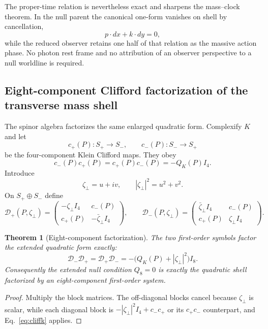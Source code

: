 \documentclass[11pt]{article}
\newtheorem{theorem}{Theorem}[section]
\theoremstyle{definition}\newtheorem{definition}[theorem]{Definition}
\theoremstyle{remark}\newtheorem{remark}[theorem]{Remark}\newtheorem{conjecture}[theorem]{Conjecture}
\begin{document}
The proper-time relation is nevertheless exact and sharpens the mass--clock theorem. In the null parent the canonical one-form vanishes on shell by cancellation,
\begin{equation}
 p\cdot dx+k\cdot dy=0,
\end{equation}
while the reduced observer retains one half of that relation as the massive action phase. No photon rest frame and no attribution of an observer perspective to a null worldline is required.

\subsection{Eight-component Clifford factorization of the transverse mass shell}

The spinor algebra factorizes the same enlarged quadratic form. Complexify $K$ and let
\begin{equation}
 c_+(P):S_+\to S_-,
 \qquad
 c_-(P):S_-\to S_+
\end{equation}
be the four-component Klein Clifford maps. They obey
\begin{equation}\label{eq:cliffk}
 c_-(P)c_+(P)=c_+(P)c_-(P)=-Q_K(P)I_4.
\end{equation}
Introduce
\begin{equation}
 \zeta_\perp=u+iv,\qquad |\zeta_\perp|^2=u^2+v^2.
\end{equation}
On $S_+\oplus S_-$ define
\begin{equation}\label{eq:Dpm}
 \mathcal D_+(P,\zeta_\perp)=
 \begin{pmatrix}
 -\zeta_\perp I_4&c_-(P)\\
 c_+(P)&-\bar\zeta_\perp I_4
 \end{pmatrix},
 \qquad
 \mathcal D_-(P,\zeta_\perp)=
 \begin{pmatrix}
 \bar\zeta_\perp I_4&c_-(P)\\
 c_+(P)&\zeta_\perp I_4
 \end{pmatrix}.
\end{equation}

\begin{theorem}[Eight-component factorization]\label{thm:8factor}
The two first-order symbols factor the extended quadratic form exactly:
\begin{equation}\label{eq:8factor}
 \boxed{
 \mathcal D_-\mathcal D_+
 =
 \mathcal D_+\mathcal D_-
 =
 -\bigl(Q_K(P)+|\zeta_\perp|^2\bigr)I_8.}
\end{equation}
Consequently the extended null condition $Q_8=0$ is exactly the quadratic shell factorized by an eight-component first-order system.
\end{theorem}
\begin{proof}
Multiply the block matrices. The off-diagonal blocks cancel because $\zeta_\perp$ is scalar, while each diagonal block is $-|\zeta_\perp|^2I_4+c_-c_+$ or its $c_+c_-$ counterpart, and Eq.~\eqref{eq:cliffk} applies.
\end{proof}
\end{document}
